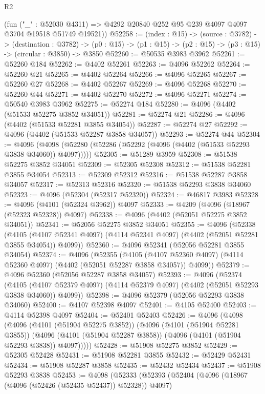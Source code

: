\begin{lexlean}{R2}
\begin{coremodule}
      (fun ("_" : @52030 @4311) =>
      @4292 @20840 @252 @95 @239 @4097 @4097 @3704 @19518 @51749 @19521))
@52258 := (index : @15) ->
  (source : @3782) ->
  (destination : @3782) ->
  (p0 : @15) -> (p1 : @15) -> (p2 : @15) -> (p3 : @15) -> (circular : @3850) -> @3850
@52260 := @50535 @3983 @3962
@52261 := @52260 @184
@52262 := @4402 @52261
@52263 := @4096 @52262
@52264 := @52260 @21
@52265 := @4402 @52264
@52266 := @4096 @52265
@52267 := @52260 @27
@52268 := @4402 @52267
@52269 := @4096 @52268
@52270 := @52260 @44
@52271 := @4402 @52270
@52272 := @4096 @52271
@52274 := @50540 @3983 @3962
@52275 := @52274 @184
@52280 := @4096 (@4402 (@51533 @52275 @3852 @34051))
@52281 := @52274 @21
@52286 := @4096 (@4402 (@51533 @52281 @3855 @34054))
@52287 := @52274 @27
@52292 := @4096 (@4402 (@51533 @52287 @3858 @34057))
@52293 := @52274 @44
@52304 := @4096
    (@4098 (@52280 (@52286 (@52292 (@4096 (@4402 (@51533 @52293 @3838 @34060)) @4097)))))
@52305 := @51289 @3959
@52308 := @51538 @52275 @3852 @34051
@52309 := @52305 @52308
@52312 := @51538 @52281 @3855 @34054
@52313 := @52309 @52312
@52316 := @51538 @52287 @3858 @34057
@52317 := @52313 @52316
@52320 := @51538 @52293 @3838 @34060
@52323 := @4096 (@52304 (@52317 @52320))
@52324 := @46817 @3983
@52328 := @4096 (@4101 (@52324 @3962)) @4097
@52333 := @4209 (@4096 (@18967 (@52323 @52328)) @4097)
@52338 := @4096 (@4402 (@52051 @52275 @3852 @34051))
@52341 := @52056 @52275 @3852 @34051
@52355 := @4096
    (@52338
      (@4105 (@4107 @52341 @4097) (@4114 @52341 @4097) (@4402 (@52051 @52281 @3855 @34054)) @4099))
@52360 := @4096 @52341 (@52056 @52281 @3855 @34054)
@52374 := @4096
    (@52355
      (@4105 (@4107 @52360 @4097) (@4114 @52360 @4097) (@4402 (@52051 @52287 @3858 @34057)) @4099))
@52379 := @4096 @52360 (@52056 @52287 @3858 @34057)
@52393 := @4096
    (@52374
      (@4105 (@4107 @52379 @4097) (@4114 @52379 @4097) (@4402 (@52051 @52293 @3838 @34060)) @4099))
@52398 := @4096 @52379 (@52056 @52293 @3838 @34060)
@52400 := @4107 @52398 @4097
@52401 := @4105 @52400
@52403 := @4114 @52398 @4097
@52404 := @52401 @52403
@52426 := @4096
    (@4098
      (@4096
        (@4101 (@51904 @52275 @3852))
        (@4096
          (@4101 (@51904 @52281 @3855))
          (@4096 (@4101 (@51904 @52287 @3858)) (@4096 (@4101 (@51904 @52293 @3838)) @4097)))))
@52428 := @51908 @52275 @3852
@52429 := @52305 @52428
@52431 := @51908 @52281 @3855
@52432 := @52429 @52431
@52434 := @51908 @52287 @3858
@52435 := @52432 @52434
@52437 := @51908 @52293 @3838
@52453 := @4098
    (@52333
      (@52393
        (@52404
          (@4096 (@18967 (@4096 (@52426 (@52435 @52437)) @52328)) @4097)

\end{coremodule}
\end{lexlean}

